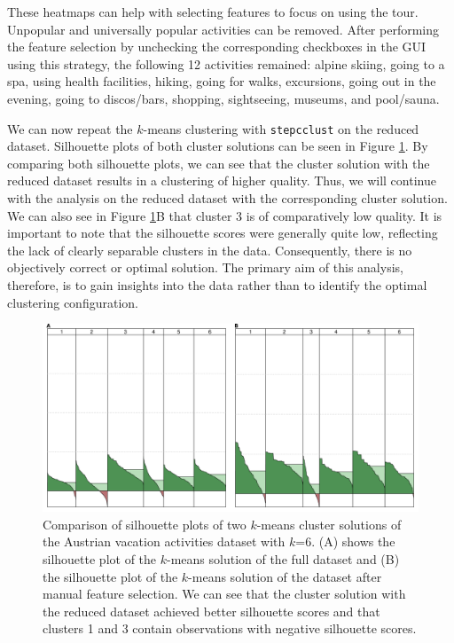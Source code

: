 \documentclass[article]{ajs}
\begin{document}
These heatmaps can help with selecting features to focus on using the tour. Unpopular and universally popular activities can be removed. After performing the feature selection by unchecking the corresponding checkboxes in the GUI using this strategy, the following 12 activities remained: alpine skiing, going to a spa, using health facilities, hiking, going for walks, excursions, going out in the evening, going to discos/bars, shopping, sightseeing, museums, and pool/sauna.

We can now repeat the $k$-means clustering with \texttt{stepcclust} on the reduced dataset. Silhouette plots of both cluster solutions can be seen in Figure \ref{fig:silhouette_comparison}. By comparing both silhouette plots, we can see that the cluster solution with the reduced dataset results in a clustering of higher quality. Thus, we will continue with the analysis on the reduced dataset with the corresponding cluster solution. We can also see in Figure \ref{fig:silhouette_comparison}B that cluster 3 is of comparatively low quality. It is important to note that the silhouette scores were generally quite low, reflecting the lack of clearly separable clusters in the data. Consequently, there is no objectively correct or optimal solution. The primary aim of this analysis, therefore, is to gain insights into the data rather than to identify the optimal clustering configuration.

\begin{figure}[h!]
    \centering
    \includegraphics[width=1\textwidth]{silhouette_comparison.pdf}
    \caption{Comparison of silhouette plots of two $k$-means cluster solutions of the Austrian vacation activities dataset with $k$=6. (A) shows the silhouette plot of the $k$-means solution of the full dataset and (B) the silhouette plot of the $k$-means solution of the dataset after manual feature selection. We can see that the cluster solution with the reduced dataset achieved better silhouette scores and that clusters 1 and 3 contain observations with negative silhouette scores.}
    \label{fig:silhouette_comparison}
\end{figure}
\end{document}
